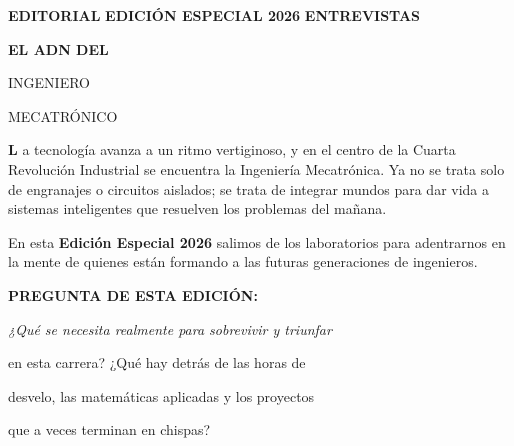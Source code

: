 \documentclass[10pt]{article}
\newcommand{\tagLabel}[2]{%
  \colorbox{#1}{\textcolor{blanco}%
    {\fontsize{6}{7}\selectfont\bfseries\quad#2\quad}}}
\newcommand{\lineaNaranja}{%
  \noindent{\color{naranja}\rule{\linewidth}{1.5pt}}\par\vspace{3pt}}
\begin{document}
\noindent\hspace{0.9cm}%
\begin{minipage}{\dimexpr\paperwidth-1.8cm}
\vspace*{0.75cm}

\noindent
\tagLabel{naranja}{EDITORIAL}\hspace{4pt}%
\tagLabel{azulOscuro}{EDICIÓN ESPECIAL 2026}\hspace{4pt}%
\tagLabel{grisClaro}{ENTREVISTAS}
\vspace{8pt}

{\fontsize{28}{33}\selectfont\bfseries\color{blanco}
  EL ADN DEL\par{\color{naranja}INGENIERO}\par MECATRÓNICO\par}
\vspace{4pt}
\lineaNaranja\vspace{6pt}

\noindent
\begin{minipage}[t]{0.61\linewidth}
\RaggedRight
\noindent
{\fontsize{38}{38}\selectfont\bfseries\color{naranja}L}%
{\small\color{grisTexto}a tecnolog\'ia avanza a un ritmo vertiginoso,
y en el centro de la Cuarta Revoluci\'on Industrial se encuentra
la Ingenier\'ia Mecatr\'onica. Ya no se trata solo de engranajes
o circuitos aislados; se trata de integrar mundos para dar vida
a sistemas inteligentes que resuelven los problemas del ma\~nana.}
\vspace{7pt}

{\small\color{grisTexto}
En esta \textbf{\color{blanco}Edici\'on Especial 2026} salimos de los
laboratorios para adentrarnos en la mente de quienes est\'an
formando a las futuras generaciones de ingenieros.}
\vspace{6pt}

\begin{tcolorbox}[colback=roseFondo,colframe=naranja,
  arc=0pt,boxrule=1.2pt,left=7pt,right=7pt,top=5pt,bottom=5pt]
\centering
{\fontsize{7}{8.5}\selectfont\bfseries\color{naranja}
  PREGUNTA DE ESTA EDICIÓN:}\par\vspace{4pt}
{\small\itshape\color{grisTexto}
  ¿Qu\'e se necesita realmente para sobrevivir y triunfar\par
  en esta carrera? ¿Qu\'e hay detr\'as de las horas de\par
  desvelo, las matem\'aticas aplicadas y los proyectos\par
  que a veces terminan en chispas?}
\end{tcolorbox}
\vspace{6pt}


\end{minipage}
\end{minipage}
\end{document}
